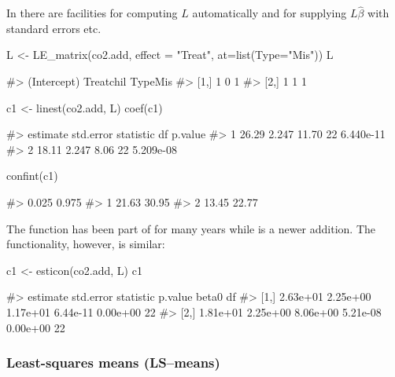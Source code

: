 In  there are facilities for computing \(L\) automatically and
for supplying \(L\hat\beta\) with standard errors etc.

\begin{Schunk}
\begin{Sinput}
L <- LE_matrix(co2.add, effect = "Treat", at=list(Type="Mis"))
L
\end{Sinput}
\begin{Soutput}
#>      (Intercept) Treatchil TypeMis
#> [1,]           1         0       1
#> [2,]           1         1       1
\end{Soutput}
\end{Schunk}

\begin{Schunk}
\begin{Sinput}
c1 <- linest(co2.add, L)
coef(c1)
\end{Sinput}
\begin{Soutput}
#>   estimate std.error statistic df   p.value
#> 1    26.29     2.247     11.70 22 6.440e-11
#> 2    18.11     2.247      8.06 22 5.209e-08
\end{Soutput}
\begin{Sinput}
confint(c1)
\end{Sinput}
\begin{Soutput}
#>   0.025 0.975
#> 1 21.63 30.95
#> 2 13.45 22.77
\end{Soutput}
\end{Schunk}

The function  has been part of  for many years
while  is a newer addition. The functionality, however, is
similar:

\begin{Schunk}
\begin{Sinput}
c1 <- esticon(co2.add, L)
c1
\end{Sinput}
\begin{Soutput}
#>      estimate std.error statistic  p.value    beta0 df
#> [1,] 2.63e+01  2.25e+00  1.17e+01 6.44e-11 0.00e+00 22
#> [2,] 1.81e+01  2.25e+00  8.06e+00 5.21e-08 0.00e+00 22
\end{Soutput}
\end{Schunk}

\hypertarget{least-squares-means-lsmeans}{%
\subsubsection{Least-squares means
(LS--means)}\label{least-squares-means-lsmeans}}

